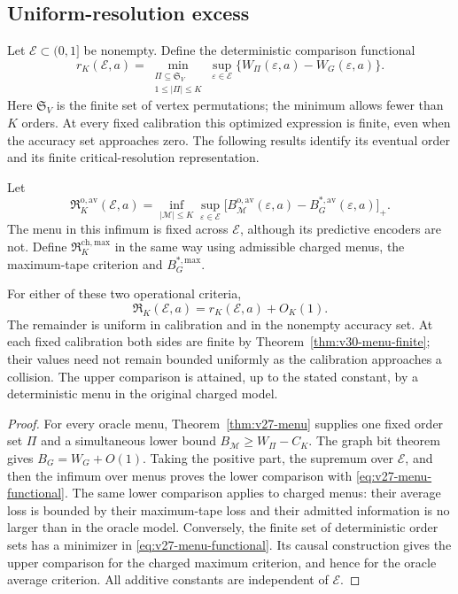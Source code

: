 \subsection{Uniform-resolution excess}
Let $\mathcal E\subset(0,1]$ be nonempty. Define the deterministic comparison functional
\begin{equation}\label{eq:v27-menu-functional}
 r_K(\mathcal E,a)=
 \min_{\substack{\Pi\subseteq\mathfrak S_V\\1\le|\Pi|\le K}}
 \sup_{\varepsilon\in\mathcal E}
       \{W_\Pi(\varepsilon,a)-W_G(\varepsilon,a)\}.
\end{equation}
Here $\mathfrak S_V$ is the finite set of vertex permutations; the minimum allows fewer than $K$ orders. At every fixed calibration this optimized expression is finite, even when the accuracy set approaches zero. The following results identify its eventual order and its finite critical-resolution representation.

Let
\[
 \mathfrak R_K^{\mathrm{o,av}}(\mathcal E,a)
 =\inf_{|\mathcal M|\le K}\sup_{\varepsilon\in\mathcal E}
 \bigl[B^{\mathrm{o,av}}_{\mathcal M}(\varepsilon,a)
                   -B_G^{*,\mathrm{av}}(\varepsilon,a)\bigr]_+.
\]
The menu in this infimum is fixed across $\mathcal E$, although its predictive encoders are not. Define $\mathfrak R_K^{\mathrm{ch,max}}$ in the same way using admissible charged menus, the maximum-tape criterion and $B_G^{*,\mathrm{max}}$.

\begin{corollary}
\label{cor:v27-menu-regret}
For either of these two operational criteria,
\begin{equation}\label{eq:v27-menu-regret}
                  \mathfrak R_K(\mathcal E,a)
                            =r_K(\mathcal E,a)+O_K(1).
\end{equation}
The remainder is uniform in calibration and in the nonempty accuracy set. At each fixed calibration both sides are finite by Theorem~\ref{thm:v30-menu-finite}; their values need not remain bounded uniformly as the calibration approaches a collision. The upper comparison is attained, up to the stated constant, by a deterministic menu in the original charged model.
\end{corollary}
\begin{proof}
For every oracle menu, Theorem~\ref{thm:v27-menu} supplies one fixed order set $\Pi$ and a simultaneous lower bound $B_{\mathcal M}\ge W_\Pi-C_K$. The graph bit theorem gives $B_G=W_G+O(1)$. Taking the positive part, the supremum over $\mathcal E$, and then the infimum over menus proves the lower comparison with \eqref{eq:v27-menu-functional}. The same lower comparison applies to charged menus: their average loss is bounded by their maximum-tape loss and their admitted information is no larger than in the oracle model. Conversely, the finite set of deterministic order sets has a minimizer in \eqref{eq:v27-menu-functional}. Its causal construction gives the upper comparison for the charged maximum criterion, and hence for the oracle average criterion. All additive constants are independent of $\mathcal E$.
\end{proof}

